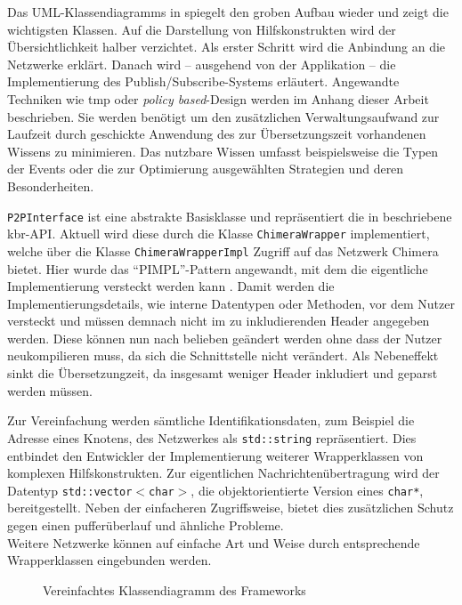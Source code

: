 Das UML-Klassendiagramms in  spiegelt den groben Aufbau wieder und zeigt die wichtigsten Klassen. Auf die Darstellung von Hilfskonstrukten wird der Übersichtlichkeit halber verzichtet. Als erster Schritt wird die Anbindung an die Netzwerke erklärt. Danach wird -- ausgehend von der Applikation -- die Implementierung des Publish/Subscribe-Systems erläutert. Angewandte Techniken wie \ac{tmp} oder \emph{policy based}-Design werden im Anhang dieser Arbeit beschrieben. Sie werden benötigt um den zusätzlichen Verwaltungsaufwand zur Laufzeit durch geschickte Anwendung des zur Übersetzungszeit vorhandenen Wissens zu minimieren. Das nutzbare Wissen umfasst beispielsweise die Typen der Events oder die zur Optimierung ausgewählten Strategien und deren Besonderheiten.

\texttt{P2PInterface} ist eine abstrakte Basisklasse und repräsentiert die in \cite{Dabek2003Towards} beschriebene \ac{kbr}-API. Aktuell wird diese durch die Klasse \texttt{ChimeraWrapper} implementiert, welche über die Klasse \texttt{ChimeraWrapperImpl} Zugriff auf das Netzwerk Chimera bietet. Hier wurde das \enquote{PIMPL}-Pattern angewandt, mit dem die eigentliche Implementierung versteckt werden kann \cite{Alexandrescu2001Modern}. Damit werden die Implementierungsdetails, wie interne Datentypen oder Methoden, vor dem Nutzer versteckt und müssen demnach nicht im zu inkludierenden Header angegeben werden. Diese können nun nach belieben geändert werden ohne dass der Nutzer neukompilieren muss, da sich die Schnittstelle nicht verändert. Als Nebeneffekt sinkt die Übersetzungzeit, da insgesamt weniger Header inkludiert und geparst werden müssen.

Zur Vereinfachung werden sämtliche Identifikationsdaten, zum Beispiel die Adresse eines Knotens, des Netzwerkes als \texttt{std::string} repräsentiert. Dies entbindet den Entwickler der Implementierung weiterer Wrapperklassen von komplexen Hilfskonstrukten. Zur eigentlichen Nachrichtenübertragung wird der Datentyp \texttt{std::vector$<$char$>$}, die objektorientierte Version eines \texttt{char*}, bereitgestellt. Neben der einfacheren Zugriffsweise, bietet dies zusätzlichen Schutz gegen einen pufferüberlauf und ähnliche Probleme.\\
Weitere Netzwerke können auf einfache Art und Weise durch entsprechende Wrapperklassen eingebunden werden.

\begin{figure}[htbp]
\centering
{}
\caption{Vereinfachtes Klassendiagramm des Frameworks}
\label{fig:uml}
\end{figure}

